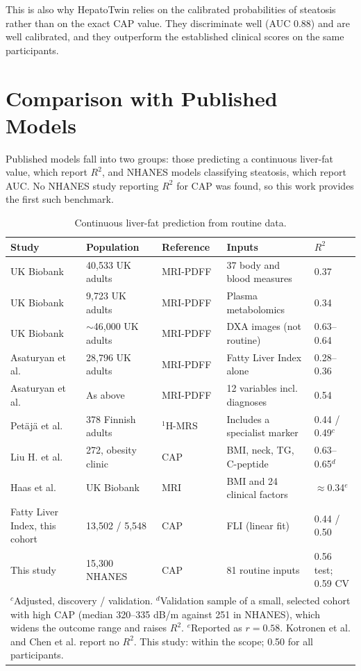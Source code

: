 This is also why HepatoTwin relies on the calibrated probabilities of
steatosis rather than on the exact CAP value. They discriminate well (AUC 0.88)
and are well calibrated, and they outperform the established clinical scores
on the same participants.

\section{Comparison with Published Models}
\label{sec:exp_published}

Published models fall into two groups: those predicting a continuous liver-fat
value, which report $R^2$, and NHANES models classifying steatosis, which
report AUC. No NHANES study reporting $R^2$ for CAP was found, so this work
provides the first such benchmark.

\begin{table}[htbp]
\centering
\caption{Continuous liver-fat prediction from routine data.}
\label{tab:exp_published_r2}
\begin{tabular}{p{3.6cm}p{2.9cm}p{1.6cm}p{3.6cm}p{1.8cm}}
\toprule
Study & Population & Reference & Inputs & $R^2$ \\
\midrule
UK Biobank \cite{insitro2024ukb} & 40,533 UK adults & MRI-PDFF & 37 body and blood measures & 0.37 \\
UK Biobank \cite{insitro2024ukb} & 9,723 UK adults & MRI-PDFF & Plasma metabolomics & 0.34 \\
UK Biobank \cite{insitro2024ukb} & $\sim$46,000 UK adults & MRI-PDFF & DXA images (not routine) & 0.63--0.64 \\
Asaturyan et al. \cite{asaturyan2022fli} & 28,796 UK adults & MRI-PDFF & Fatty Liver Index alone & 0.28--0.36 \\
Asaturyan et al. \cite{asaturyan2022fli} & As above & MRI-PDFF & 12 variables incl. diagnoses & 0.54 \\
Pet\"aj\"a et al. \cite{petaja2016igfbp} & 378 Finnish adults & $^1$H-MRS & Includes a specialist marker & 0.44 / 0.49$^{c}$ \\
Liu H. et al. \cite{liu2022surrogate} & 272, obesity clinic & CAP & BMI, neck, TG, C-peptide & 0.63--0.65$^{d}$ \\
Haas et al. \cite{haas2021liverfat} & UK Biobank & MRI & BMI and 24 clinical factors & $\approx$0.34$^{e}$ \\
Fatty Liver Index, this cohort & 13,502 / 5,548 & CAP & FLI (linear fit) & 0.44 / 0.50 \\
\midrule
This study & 15,300 NHANES & CAP & 81 routine inputs & 0.56 test; 0.59 CV \\
\bottomrule
\multicolumn{5}{p{14cm}}{\small $^{c}$Adjusted, discovery / validation. $^{d}$Validation sample of a small, selected cohort with high CAP (median 320--335 dB/m against 251 in NHANES), which widens the outcome range and raises $R^2$. $^{e}$Reported as $r=0.58$. Kotronen et al. \cite{kotronen2009prediction} and Chen et al. \cite{chen2023shsi} report no $R^2$. This study: within the scope; 0.50 for all participants.}
\end{tabular}
\end{table}

